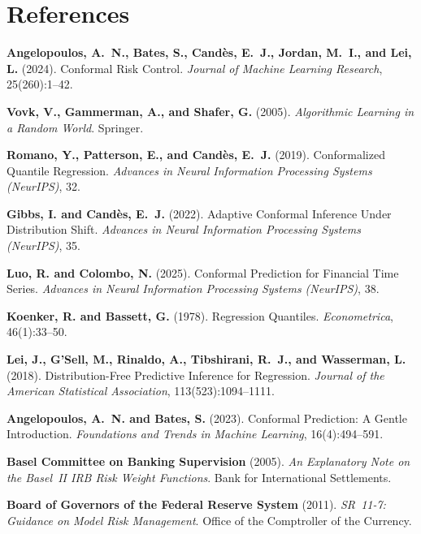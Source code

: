 \documentclass[11pt, a4paper]{article}
\theoremstyle{definition}
\theoremstyle{plain}
\theoremstyle{remark}
\begin{document}
\section{References}
\label{sec:references}

\begin{enumerate}[label={[\arabic*]}]
    \item \textbf{Angelopoulos, A.~N., Bates, S., Cand\`{e}s, E.~J.,
          Jordan, M.~I., and Lei, L.} (2024).
          Conformal Risk Control.
          \emph{Journal of Machine Learning Research}, 25(260):1--42.

    \item \textbf{Vovk, V., Gammerman, A., and Shafer, G.} (2005).
          \emph{Algorithmic Learning in a Random World}.
          Springer.

    \item \textbf{Romano, Y., Patterson, E., and Cand\`{e}s, E.~J.} (2019).
          Conformalized Quantile Regression.
          \emph{Advances in Neural Information Processing Systems (NeurIPS)}, 32.

    \item \textbf{Gibbs, I. and Cand\`{e}s, E.~J.} (2022).
          Adaptive Conformal Inference Under Distribution Shift.
          \emph{Advances in Neural Information Processing Systems (NeurIPS)}, 35.

    \item \textbf{Luo, R. and Colombo, N.} (2025).
          Conformal Prediction for Financial Time Series.
          \emph{Advances in Neural Information Processing Systems (NeurIPS)}, 38.

    \item \textbf{Koenker, R. and Bassett, G.} (1978).
          Regression Quantiles.
          \emph{Econometrica}, 46(1):33--50.

    \item \textbf{Lei, J., G'Sell, M., Rinaldo, A., Tibshirani, R.~J., and
          Wasserman, L.} (2018).
          Distribution-Free Predictive Inference for Regression.
          \emph{Journal of the American Statistical Association}, 113(523):1094--1111.

    \item \textbf{Angelopoulos, A.~N. and Bates, S.} (2023).
          Conformal Prediction: A Gentle Introduction.
          \emph{Foundations and Trends in Machine Learning}, 16(4):494--591.

    \item \textbf{Basel Committee on Banking Supervision} (2005).
          \emph{An Explanatory Note on the Basel~II IRB Risk Weight Functions}.
          Bank for International Settlements.

    \item \textbf{Board of Governors of the Federal Reserve System} (2011).
          \emph{SR~11-7: Guidance on Model Risk Management}.
          Office of the Comptroller of the Currency.
\end{enumerate}
\end{document}

